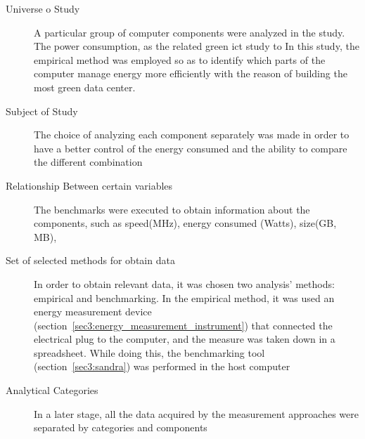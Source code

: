    \begin{description}
    \item[Universe o Study] 
    A particular group of computer components were analyzed in the study. The power consumption, as the related green ict study to 
    In this study, the empirical method was employed so as to identify which parts of the computer manage energy more efficiently with the reason of building the most green data center. 
    
    \item[Subject of Study]
    The choice of analyzing each component separately was made in order to have a better control of the energy consumed and the ability to compare the different combination 
    
    \item[Relationship Between certain variables]
    The benchmarks were executed to obtain information about the components, such as speed(MHz), energy consumed (Watts), size(GB, MB), 
    
    \item[Set of selected methods for obtain data] 
    In order to obtain relevant data, it was chosen two analysis' methods: empirical and benchmarking. In the empirical method, it was used an energy measurement device (section~\ref{sec3:energy_measurement_instrument}) that connected the electrical plug to the computer, and the measure was taken down in a spreadsheet. While doing this, the benchmarking tool (section~\ref{sec3:sandra}) was performed in the host computer
    
    
    \item[Analytical Categories]
    In a later stage, all the data acquired by the measurement approaches were separated by categories and components
    
    \end{description}
    
